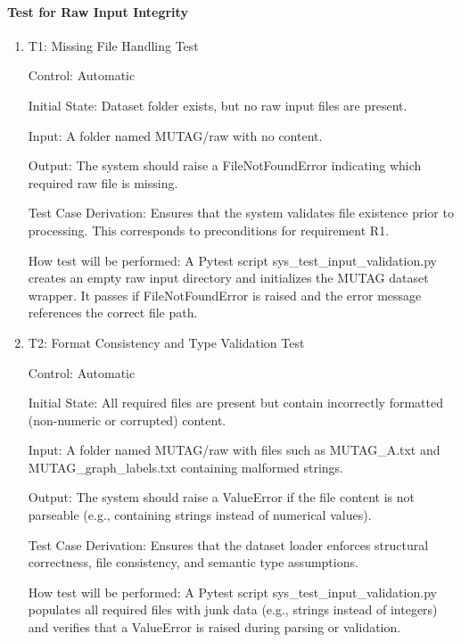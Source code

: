 \documentclass[12pt, titlepage]{article}
\begin{document}
\paragraph{Test for Raw Input Integrity}

\begin{enumerate}

\item{T1: Missing File Handling Test\\}

Control: Automatic

Initial State: Dataset folder exists, but no raw input files are present.

Input: A folder named MUTAG/raw with no content.

Output: The system should raise a FileNotFoundError indicating which required raw file is missing.

Test Case Derivation: Ensures that the system validates file existence prior to processing. This corresponds to preconditions for requirement R1.

How test will be performed: A Pytest script sys\_test\_input\_validation.py creates an empty raw input directory and initializes the MUTAG dataset wrapper. It passes if FileNotFoundError is raised and the error message references the correct file path.

\vspace{0.3em}

\item{T2: Format Consistency and Type Validation Test\\}

Control: Automatic

Initial State: All required files are present but contain incorrectly formatted (non-numeric or corrupted) content.

Input: A folder named MUTAG/raw with files such as MUTAG\_A.txt and MUTAG\_graph\_labels.txt containing malformed strings.

Output: The system should raise a ValueError if the file content is not parseable (e.g., containing strings instead of numerical values).

Test Case Derivation: Ensures that the dataset loader enforces structural correctness, file consistency, and semantic type assumptions.

How test will be performed: A Pytest script sys\_test\_input\_validation.py populates all required files with junk data (e.g., strings instead of integers) and verifies that a ValueError is raised during parsing or validation.


\end{enumerate}
\end{document}
